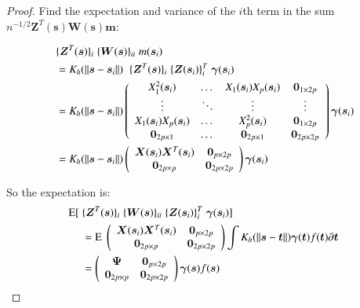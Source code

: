 \documentclass[authoryear, review, 11pt]{elsarticle}
\begin{document}
        \begin{proof}
            Find the expectation and variance of the $i$th term in the sum $n^{-1/2} \bm{Z}^T(\bm{s}) \bm{W}(\bm{s}) \bm{m}$:

            \begin{align}
                \; &\{ \bm{Z}^T(\bm{s}) \}_i \; \{ \bm{W}(\bm{s}) \}_{ii} \; m(\bm{s}_i) \notag \\ 
                &= K_h(\| \bm{s} - \bm{s}_i \|) \; \; \{ \bm{Z}^T(\bm{s}) \}_i \; \{ \bm{Z}(\bm{s}_i) \}_i^T \; \bm{\gamma}(\bm{s}_i) \notag \\
                &= K_h(\| \bm{s} - \bm{s}_i \|) \left( \begin{array}{cccc} X_1^2(\bm{s}_i) & \dots & X_1(\bm{s}_i) X_p(\bm{s}_i) & \bm{0}_{1 \times 2p} \\ \vdots & \ddots & \vdots & \vdots \\ X_1(\bm{s}_i) X_p(\bm{s}_i) & \dots & X_p^2(\bm{s}_i) & \bm{0}_{1 \times 2p} \\ \bm{0}_{2p \times 1} & \dots & \bm{0}_{2p \times 1} & \bm{0}_{2p \times 2p} \end{array} \right) \bm{\gamma}(\bm{s}_i) \notag \\
                &= K_h(\| \bm{s} - \bm{s}_i \|) \left( \begin{array}{cc} \bm{X}(\bm{s}_i) \bm{X}^T(\bm{s}_i)  & \bm{0}_{p \times 2p} \\ \bm{0}_{2p \times p} & \bm{0}_{2p \times 2p} \end{array} \right) \bm{\gamma}(\bm{s}_i)
            \end{align}

            So the expectation is:
            \begin{align}
                \text{E} [ \; &\{ \bm{Z}^T(\bm{s}) \}_i \; \{ \bm{W}(\bm{s}) \}_{ii} \; \{ \bm{Z}(\bm{s}_i) \}_i^T \; \bm{\gamma}(\bm{s}_i) ] \notag \\
                &= \text{E} \; \left( \begin{array}{cc} \bm{X}(\bm{s}_i) \bm{X}^T(\bm{s}_i)  & \bm{0}_{p \times 2p} \\ \bm{0}_{2p \times p} & \bm{0}_{2p \times 2p} \end{array} \right) \int K_h(\| \bm{s} - \bm{t} \|) \bm{\gamma}(\bm{t}) f(\bm{t}) \partial \bm{t} \notag \\
                &= \left( \begin{array}{cc} \bm{\Psi}  & \bm{0}_{p \times 2p} \\ \bm{0}_{2p \times p} & \bm{0}_{2p \times 2p} \end{array} \right) \bm{\gamma}(\bm{s}) f(\bm{s})
            \end{align}
    

\end{proof}
\end{document}
